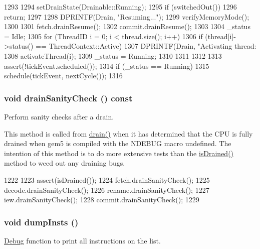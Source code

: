 \begin{DoxyCode}
1293 {
1294     setDrainState(Drainable::Running);
1295     if (switchedOut())
1296         return;
1297 
1298     DPRINTF(Drain, "Resuming...\n");
1299     verifyMemoryMode();
1300 
1301     fetch.drainResume();
1302     commit.drainResume();
1303 
1304     _status = Idle;
1305     for (ThreadID i = 0; i < thread.size(); i++) {
1306         if (thread[i]->status() == ThreadContext::Active) {
1307             DPRINTF(Drain, "Activating thread: %
1308             activateThread(i);
1309             _status = Running;
1310         }
1311     }
1312 
1313     assert(!tickEvent.scheduled());
1314     if (_status == Running)
1315         schedule(tickEvent, nextCycle());
1316 }
\end{DoxyCode}
\hypertarget{classFullO3CPU_a0240eb42fa57fe5d3788093f62b77347}{
\subsubsection[{drainSanityCheck}]{\setlength{\rightskip}{0pt plus 5cm}void drainSanityCheck () const}}
\label{classFullO3CPU_a0240eb42fa57fe5d3788093f62b77347}
Perform sanity checks after a drain.

This method is called from \hyperlink{classFullO3CPU_a4e932bfc8aa6dfb998b8496a0f04ace3}{drain()} when it has determined that the CPU is fully drained when gem5 is compiled with the NDEBUG macro undefined. The intention of this method is to do more extensive tests than the \hyperlink{classFullO3CPU_adf5473c18a3d7c1e88c4a2072bce5526}{isDrained()} method to weed out any draining bugs. 


\begin{DoxyCode}
1222 {
1223     assert(isDrained());
1224     fetch.drainSanityCheck();
1225     decode.drainSanityCheck();
1226     rename.drainSanityCheck();
1227     iew.drainSanityCheck();
1228     commit.drainSanityCheck();
1229 }
\end{DoxyCode}
\hypertarget{classFullO3CPU_a80587b4fe043bbe1995536cb3b361588}{
\subsubsection[{dumpInsts}]{\setlength{\rightskip}{0pt plus 5cm}void dumpInsts ()}}
\label{classFullO3CPU_a80587b4fe043bbe1995536cb3b361588}
\hyperlink{namespaceDebug}{Debug} function to print all instructions on the list. 


